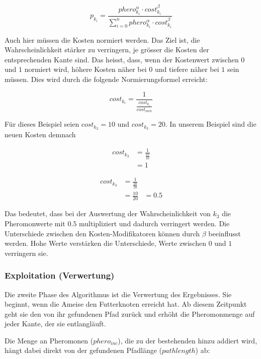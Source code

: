 \[ p_{k_i} = \frac{phero_{k_i}^\alpha \cdot cost_{k_i}^\beta}{\sum\nolimits_{i=0}^n phero_{k_i}^\alpha \cdot cost_{k_i}^\beta} \] 

\noindent
Auch hier müssen die Kosten normiert werden. Das Ziel ist, die Wahrscheinlichkeit stärker zu verringern, je grösser die Kosten der entsprechenden Kante sind. Das heisst, dass, wenn der Kostenwert zwischen $0$ und $1$ normiert wird, höhere Kosten näher bei $0$ und tiefere näher bei $1$ sein müssen. Dies wird durch die folgende Normierungsformel erreicht:

\[ cost_{k_i} = \frac{1}{\frac{cost_{k_i}}{cost_{min}}} \]

\noindent
Für dieses Beispiel seien $cost_{k_2} = 10$ und $cost_{k_3} = 20$. In unserem Beispiel sind die neuen Kosten demnach

\begin{equation*}
\begin{split}
cost_{k_2} & = \frac{1}{\frac{10}{10}} \\
           & = 1
\end{split}
\end{equation*}

\begin{equation*}
\begin{split}
cost_{k_3} & = \frac{1}{\frac{20}{10}} \\
           & = \frac{10}{20}
           & = 0.5
\end{split}
\end{equation*}

\noindent
Das bedeutet, dass bei der Auswertung der Wahrscheinlichkeit von $k_3$ die Pheromonwerte mit $0.5$ multipliziert und dadurch verringert werden. Die Unterschiede zwischen den Kosten-Modifikatoren können durch $\beta$ beeinflusst werden. Hohe Werte verstärken die Unterschiede, Werte zwischen $0$ und $1$ verringern sie.

\subsubsection*{Exploitation (Verwertung)}

Die zweite Phase des Algorithmus ist die Verwertung des Ergebnisses. Sie beginnt, wenn die Ameise den Futterknoten erreicht hat. Ab diesem Zeitpunkt geht sie den von ihr gefundenen Pfad zurück und erhöht die Pheromonmenge auf jeder Kante, der sie entlangläuft.

Die Menge an Pheromonen ($phero_{inc}$), die zu der bestehenden hinzu addiert wird, hängt dabei direkt von der gefundenen Pfadlänge ($pathlength$) ab:

